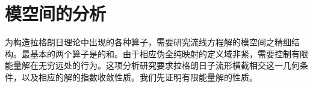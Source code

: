 \chapter{\personFloer{}模空间的\termOnShell{}分析}
\label{ch:on-shell-analysis}

为构造拉格朗日\personFloer{}理论中出现的各种算子，需要研究\personFloer{}流线方程解的模空间之精细结构。最基本的两个算子是\personFloer{}的\termPreBoundaryMap{}和\termPreChainMap{}。由于相应伪全纯映射的定义域非紧，需要控制有限能量解在无穷远处的行为。这项分析研究要求拉格朗日子流形横截相交这一几何条件，以及相应的解的指数收敛性质。我们先证明有限能量解的\termExponentialDecay{}性质。






